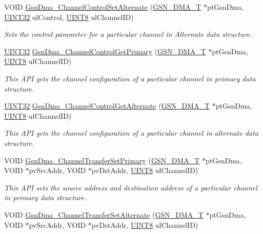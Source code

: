 \begin{DoxyCompactItemize}
VOID \hyperlink{a00645_ga20dfa4fbdf89c9623e33349ac917a0f7}{GsnDma\_\-ChannelControlSetAlternate} (\hyperlink{a00049}{GSN\_\-DMA\_\-T} $\ast$ptGsnDma, \hyperlink{a00660_gae1e6edbbc26d6fbc71a90190d0266018}{UINT32} ulControl, \hyperlink{a00660_gab27e9918b538ce9d8ca692479b375b6a}{UINT8} ulChannelID)
\begin{DoxyCompactList}\small\item\em Sets the control parameter for a particular channel in Alternate data structure. \end{DoxyCompactList}\item 
\hyperlink{a00660_gae1e6edbbc26d6fbc71a90190d0266018}{UINT32} \hyperlink{a00645_gae299f12e8d6fe7d3e1aed64ca683e5d4}{GsnDma\_\-ChannelControlGetPrimary} (\hyperlink{a00049}{GSN\_\-DMA\_\-T} $\ast$ptGsnDma, \hyperlink{a00660_gab27e9918b538ce9d8ca692479b375b6a}{UINT8} ulChannelID)
\begin{DoxyCompactList}\small\item\em This API gets the channel configuration of a particular channel in primary data structure. \end{DoxyCompactList}\item 
\hyperlink{a00660_gae1e6edbbc26d6fbc71a90190d0266018}{UINT32} \hyperlink{a00645_ga3f2ad549f5231785b43dcdafff7dad76}{GsnDma\_\-ChannelControlGetAlternate} (\hyperlink{a00049}{GSN\_\-DMA\_\-T} $\ast$ptGsnDma, \hyperlink{a00660_gab27e9918b538ce9d8ca692479b375b6a}{UINT8} ulChannelID)
\begin{DoxyCompactList}\small\item\em This API gets the channel configuration of a particular channel in alternate data structure. \end{DoxyCompactList}\item 
VOID \hyperlink{a00645_gacf14d2b733378887f57720111f5a273c}{GsnDma\_\-ChannelTransferSetPrimary} (\hyperlink{a00049}{GSN\_\-DMA\_\-T} $\ast$ptGsnDma, VOID $\ast$pvSrcAddr, VOID $\ast$pvDstAddr, \hyperlink{a00660_gab27e9918b538ce9d8ca692479b375b6a}{UINT8} ulChannelID)
\begin{DoxyCompactList}\small\item\em This API sets the source address and destination address of a particular channel in primary data structure. \end{DoxyCompactList}\item 
VOID \hyperlink{a00645_gafa916751ce4bc1ff2e107afa8e105b23}{GsnDma\_\-ChannelTransferSetAlternate} (\hyperlink{a00049}{GSN\_\-DMA\_\-T} $\ast$ptGsnDma, VOID $\ast$pvSrcAddr, VOID $\ast$pvDstAddr, \hyperlink{a00660_gab27e9918b538ce9d8ca692479b375b6a}{UINT8} ulChannelID)

\end{DoxyCompactItemize}
